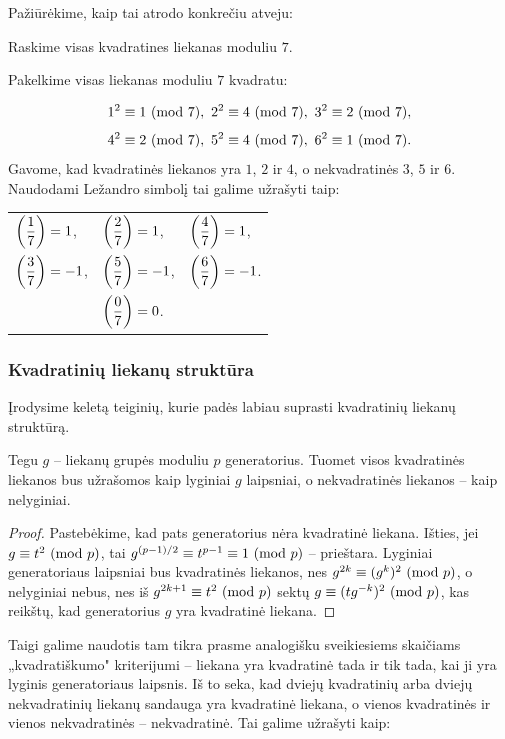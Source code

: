Pažiūrėkime, kaip tai atrodo konkrečiu atveju:
\begin{pav} Raskime visas kvadratines liekanas moduliu $7$.
\end{pav}
\begin{sprendimas}
Pakelkime visas liekanas moduliu $7$ kvadratu: 

$$1^2 \equiv 1 \ (\text{mod } 7),\ 2^2 \equiv 4 \ (\text{mod } 7),\ 3^2 \equiv 2 \ (\text{mod } 7),$$ $$4^2
\equiv 2 \ (\text{mod } 7),\ 5^2 \equiv 4 \ (\text{mod } 7),\ 6^2 \equiv 1 \ (\text{mod } 7).$$
Gavome, kad kvadratinės liekanos yra $1$, $2$ ir $4$, o nekvadratinės $3$,
$5$ ir $6$. Naudodami Ležandro simbolį tai galime užrašyti taip:
\begin{center}\begin{tabular}{l l l}
  $\displaystyle{\left(\frac{1}{7}\right)=1}$,& $\displaystyle{\left(\frac{2}{7}\right)=1}$,&
  $\displaystyle{\left(\frac{4}{7}\right)=1}$, \\ 
  $\displaystyle{\left(\frac{3}{7}\right)=-1}$,& $\displaystyle{\left(\frac{5}{7}\right)=-1}$,&
  $\displaystyle{\left(\frac{6}{7}\right)=-1}$.\rule{0pt}{4ex} \\
  & $\displaystyle{\left(\frac{0}{7}\right)=0}$.\rule{0pt}{4ex} &
\end{tabular}\end{center}
\end{sprendimas}

\subsubsection{Kvadratinių liekanų struktūra}

Įrodysime keletą teiginių, kurie padės labiau suprasti kvadratinių liekanų
struktūrą.

\begin{teig} Tegu $g$ -- liekanų grupės moduliu $p$ generatorius. Tuomet
  visos kvadratinės liekanos bus užrašomos kaip lyginiai $g$ laipsniai, o
  nekvadratinės liekanos -- kaip nelyginiai.  
\end{teig} 

\begin{proof} Pastebėkime, kad pats generatorius nėra kvadratinė
liekana. Išties, jei $g \equiv t^2 \ (\text{mod } p)$, tai $g^{(p-1)/2} \equiv
t^{p-1} \equiv 1 \ (\text{mod } p)$ -- prieštara.
Lyginiai generatoriaus laipsniai bus kvadratinės liekanos, nes
$g^{2k}\equiv (g^{k})^2 \ (\text{mod } p)$, o nelyginiai nebus, nes iš  $g^{2k+1}\equiv
t^2 \ (\text{mod } p)$ sektų $g\equiv (tg^{-k})^2\ (\text{mod } p)$, kas reikštų, kad
generatorius $g$ yra kvadratinė liekana. 
\end{proof}


Taigi galime naudotis tam tikra prasme analogišku sveikiesiems skaičiams
„kvadratiškumo" kriterijumi -- liekana yra kvadratinė tada ir tik tada, kai
ji yra lyginis generatoriaus laipsnis. Iš to seka, kad dviejų kvadratinių
arba dviejų nekvadratinių liekanų sandauga yra kvadratinė liekana, o vienos
kvadratinės ir vienos nekvadratinės -- nekvadratinė. Tai galime užrašyti
kaip: 


